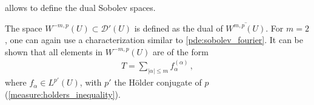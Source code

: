      allows to define the dual Sobolev spaces.
    \begin{definition}
        The space $W^{-m,p}(U)\subset\mathcal{D}'(U)$ is defined as the dual of $\overline{W^{m,p}(U)}$. For $m=2$, one can again use a characterization similar to \cref{pde:sobolev_fourier}. It can be shown that all elements in $W^{-m,p}(U)$ are of the form
        \begin{gather}
            T = \sum_{|\alpha|\leq m}f^{(\alpha)}_\alpha\,,
        \end{gather}
        where $f_\alpha\in L^{p'}(U)$, with $p'$ the H\"older conjugate of $p$ (\cref{measure:holders_inequality}).
    \end{definition}
